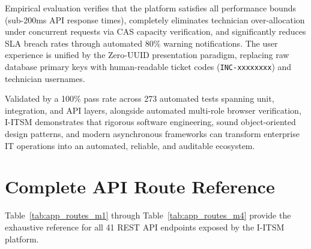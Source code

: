 \documentclass[11pt,a4paper,oneside]{report}
\begin{document}
Empirical evaluation verifies that the platform satisfies all performance bounds (sub-200ms API response times), completely eliminates technician over-allocation under concurrent requests via CAS capacity verification, and significantly reduces SLA breach rates through automated 80\% warning notifications. The user experience is unified by the Zero-UUID presentation paradigm, replacing raw database primary keys with human-readable ticket codes (\texttt{INC-xxxxxxxx}) and technician usernames.

Validated by a 100\% pass rate across 273 automated tests spanning unit, integration, and API layers, alongside automated multi-role browser verification, I-ITSM demonstrates that rigorous software engineering, sound object-oriented design patterns, and modern asynchronous frameworks can transform enterprise IT operations into an automated, reliable, and auditable ecosystem.


\appendix

\chapter{Complete API Route Reference}
\label{app:api_reference}

Table~\ref{tab:app_routes_m1} through Table~\ref{tab:app_routes_m4} provide the exhaustive reference for all 41 REST API endpoints exposed by the I-ITSM platform.
\end{document}
